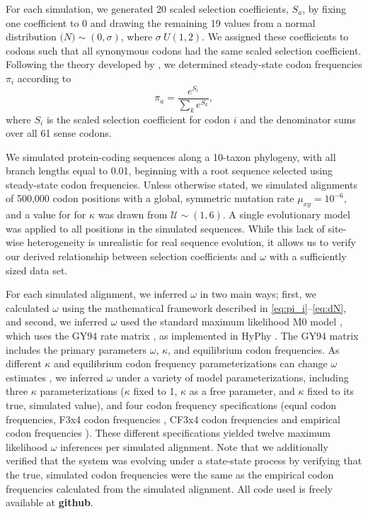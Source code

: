\documentclass[11pt]{article}
\begin{document}
For each simulation, we generated 20 scaled selection coefficients, $S_a$, by fixing one coefficient to 0 and drawing the remaining 19 values from a normal distribution $\mathcal(N)\sim(0,\sigma)$, where $\sigma ~ U(1,2)$. We assigned these coefficients to codons such that all synonymous codons had the same scaled selection coefficient. Following the theory developed by \cite{SellaHirsh2005}, we determined steady-state codon frequencies $\pi_i$ according to \begin{equation} \pi_a = \frac{e^{S_i}}{\sum_k e^{S_k}}, \end{equation} where $S_i$ is the scaled selection coefficient for codon $i$ and the denominator sums over all 61 sense codons. 
 
We simulated protein-coding sequences along a 10-taxon phylogeny, with all branch lengths equal to 0.01, beginning with a root sequence selected using steady-state codon frequencies. Unless otherwise stated, we simulated alignments of 500,000 codon positions with a global, symmetric mutation rate $\mu_{xy} = 10^{-6}$, and a value for for $\kappa$ was drawn from $\mathcal{U} \sim (1,6)$. A single evolutionary model was applied to all positions in the simulated sequences. While this lack of site-wise heterogeneity is unrealistic for real sequence evolution, it allows us to verify our derived relationship between selection coefficients and $\omega$ with a sufficiently sized data set.

For each simulated alignment, we inferred $\omega$ in two main ways; first, we calculated $\omega$ using the mathematical framework described in \eqref{eq:pi_i}--\eqref{eq:dN}, and second, we inferred $\omega$ used the standard maximum likelihood M0 model \cite{NielsenYang1998}, which uses the GY94 rate matrix \cite{GoldmanYang1994}, as implemented in HyPhy \cite{KosakovskyPondetal2005}. The GY94 matrix includes the primary parameters $\omega$, $\kappa$, and equilibrium codon frequencies. As different $\kappa$ and equilibrium codon frequency parameterizations can change $\omega$ estimates \cite{YN00, Yang2006}, we inferred $\omega$ under a variety of model parameterizations, including three $\kappa$ parameterizations ($\kappa$ fixed to 1, $\kappa$ as a free parameter, and $\kappa$ fixed to its true, simulated value), and four codon frequency specifications (equal codon frequencies,  F3x4 codon frequencies \cite{MuseGaut1994}, CF3x4 codon frequencies \cite{Pond2010} and empirical codon frequencies \cite{GoldmanYang1994}). These different specifications yielded twelve maximum likelihood $\omega$ inferences per simulated alignment. Note that we additionally verified that the system was evolving under a state-state process by verifying that the true, simulated codon frequencies were the same as the empirical codon frequencies calculated from the simulated alignment. All code used is freely available at \textbf{github}. 
\end{document}
